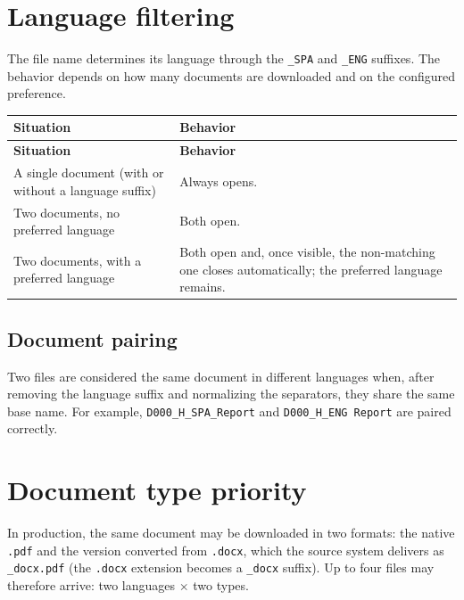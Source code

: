 \documentclass[11pt,a4paper]{article}
\begin{document}
\section{Language filtering}
The file name determines its language through the \texttt{\_SPA} and \texttt{\_ENG}
suffixes. The behavior depends on how many documents are downloaded and on the
configured preference.

\begin{xltabular}{\textwidth}{@{} L L @{}}
\toprule
\textbf{Situation} & \textbf{Behavior} \\
\midrule
\endfirsthead
\toprule
\textbf{Situation} & \textbf{Behavior} \\
\midrule
\endhead
\bottomrule
\endfoot
A single document (with or without a language suffix) & Always opens. \\
Two documents, no preferred language & Both open. \\
Two documents, with a preferred language & Both open and, once visible, the
non-matching one closes automatically; the preferred language remains. \\
\bottomrule
\end{xltabular}

\subsection{Document pairing}
Two files are considered the same document in different languages when, after
removing the language suffix and normalizing the separators, they share the same
base name. For example, \texttt{D000\_H\_SPA\_Report} and
\texttt{D000\_H\_ENG Report} are paired correctly.

\section{Document type priority}
In production, the same document may be downloaded in two formats: the native
\texttt{.pdf} and the version converted from \texttt{.docx}, which the source
system delivers as \texttt{\_docx.pdf} (the \texttt{.docx} extension becomes a
\texttt{\_docx} suffix). Up to four files may therefore arrive: two languages
$\times$ two types.
\end{document}
